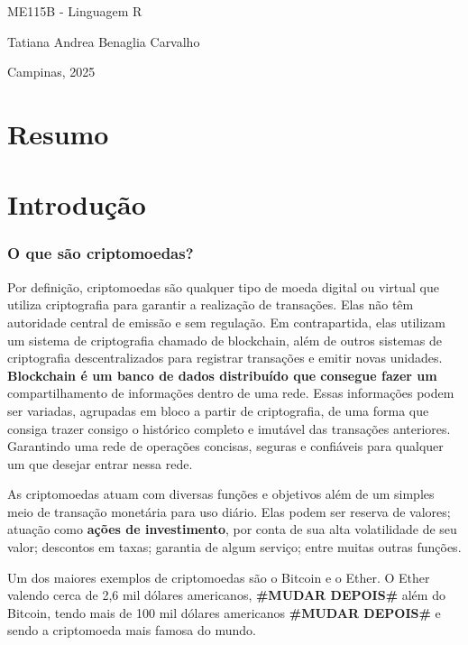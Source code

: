 \documentclass[12pt]{article}
\begin{document}
\begin{titlepage}
    \vspace{2cm}
    {\large ME115B - Linguagem R \par}
    {\large Tatiana Andrea Benaglia Carvalho \par}
    \vfill
    {\large Campinas, 2025 \par}
\end{titlepage}

\newpage

\section*{Resumo}

\section*{Introdução}

\subsubsection*{O que são criptomoedas?}
Por definição, criptomoedas são qualquer tipo de moeda digital ou virtual que utiliza criptografia para garantir a realização de transações. Elas não têm autoridade central de emissão e sem regulação. Em contrapartida, elas utilizam um sistema de criptografia chamado de blockchain, além de outros sistemas de criptografia descentralizados para registrar transações e emitir novas unidades. 
\textbf{Blockchain é um banco de dados distribuído que consegue fazer um} compartilhamento de informações dentro de uma rede. Essas informações podem ser variadas, agrupadas em bloco a partir de criptografia, de uma forma que consiga trazer consigo o histórico completo e imutável das transações anteriores. Garantindo uma rede de operações concisas, seguras e confiáveis para qualquer um que desejar entrar nessa rede.

As criptomoedas atuam com diversas funções e objetivos além de um simples meio de transação monetária para uso diário. Elas podem ser reserva de valores; atuação como \textbf{ações de investimento}, por conta de sua alta volatilidade de seu valor; descontos em taxas; garantia de algum serviço; entre muitas outras funções.

Um dos maiores exemplos de criptomoedas são o Bitcoin e o Ether. O Ether valendo cerca de 2,6 mil dólares americanos, \textbf{\#MUDAR DEPOIS\#} além do Bitcoin, tendo mais de 100 mil dólares americanos \textbf{\#MUDAR DEPOIS\#} e sendo a criptomoeda mais famosa do mundo.
\end{document}
